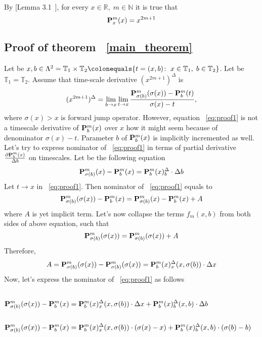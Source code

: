 By [Lemma 3.1~\cite{kolosov2016link}], for every $x\in\mathbb{R}, \; m\in\mathbb{N}$ it is true that
\begin{equation}
    \label{eq:odd_power_identity}
    {\mathbf{P}}\sp{m} \sb{x}(x) = x^{2m+1}
\end{equation}

\subsection*{Proof of theorem ~\ref{main_theorem}}
Let be
$x,b\in \Lambda^2 = \mathbb{T}_1 \times \mathbb{T}_2
\colonequals \{t = (x,b) \colon \; x\in\mathbb{T}_1, \; b\in\mathbb{T}_2\}$.
Let be $\mathbb{T}_1 = \mathbb{T}_2$.
Assume that time-scale derivative $(x^{2m+1})^{\Delta}$ is
\begin{equation}
    \label{eq:proof1}
    (x^{2m+1})^{\Delta}
    = \lim \limits_{b \to x}
    \lim \limits_{t \to x}
    \frac{{\mathbf{P}}\sp{m} \sb{\sigma(b)}(\sigma(x)) - {\mathbf{P}}\sp{m} \sb{b}(t)}{\sigma(x) - t},
\end{equation}
where $\sigma(x) > x$ is forward jump operator.
However, equation ~\eqref{eq:proof1} is not a timescale derivative of ${\mathbf{P}}\sp{m} \sb{b}(x)$ over $x$
how it might seem because of denominator $\sigma(x) - t$.
Parameter $b$ of ${\mathbf{P}}\sp{m} \sb{b}(x)$ is implicitly incremented as well.
Let's try to express nominator of ~\eqref{eq:proof1} in terms of
partial derivative $\frac{\partial {\mathbf{P}}\sp{m} \sb{b}(x)}{\Delta b}$ on timescales.
Let be the following equation
\[
    {\mathbf{P}}\sp{m} \sb{\sigma(b)}(x) - {\mathbf{P}}\sp{m} \sb{b}(x)
    = {\mathbf{P}}\sp{m} \sb{b}(x)^{\Delta}_{b} \cdot \Delta b
\]
Let $t \to x$ in ~\eqref{eq:proof1}.
Then nominator of ~\eqref{eq:proof1} equals to
\[
    {\mathbf{P}}\sp{m} \sb{\sigma(b)}(\sigma(x)) - {\mathbf{P}}\sp{m} \sb{b}(x)
    = {\mathbf{P}}\sp{m} \sb{\sigma(b)}(x) - {\mathbf{P}}\sp{m} \sb{b}(x) + A
\]
where $A$ is yet implicit term.
Let's now collapse the terms $f_m (x, b)$ from both sides of above equation, such that
\[
    {\mathbf{P}}\sp{m} \sb{\sigma(b)}(\sigma(x)) = {\mathbf{P}}\sp{m} \sb{\sigma(b)}(\sigma(x)) + A
\]
Therefore,
\[
    A = {\mathbf{P}}\sp{m} \sb{\sigma(b)}(\sigma(x)) - {\mathbf{P}}\sp{m} \sb{\sigma(b)}(\sigma(x))
    = {\mathbf{P}}\sp{m} \sb{b}(x)^{\Delta}_{x} (x, \sigma(b)) \cdot \Delta x
\]
Now, let's express the nominator of ~\eqref{eq:proof1} as follows
\begin{align*}
    \\
    {\mathbf{P}}\sp{m} \sb{\sigma(b)}(\sigma(x)) - {\mathbf{P}}\sp{m} \sb{b}(x)
    &= {\mathbf{P}}\sp{m} \sb{b}(x)^{\Delta}_{x} (x, \sigma(b)) \cdot \Delta x + {\mathbf{P}}\sp{m} \sb{b}(x)^{\Delta}_{b} (x,b) \cdot \Delta b \\
    \\
    {\mathbf{P}}\sp{m} \sb{\sigma(b)}(\sigma(x)) - {\mathbf{P}}\sp{m} \sb{b}(x)
    &= {\mathbf{P}}\sp{m} \sb{b}(x)^{\Delta}_{x} (x, \sigma(b)) \cdot (\sigma(x) - x) + {\mathbf{P}}\sp{m} \sb{b}(x)^{\Delta}_{b} (x,b) \cdot (\sigma(b) - b)
    \\
\end{align*}
